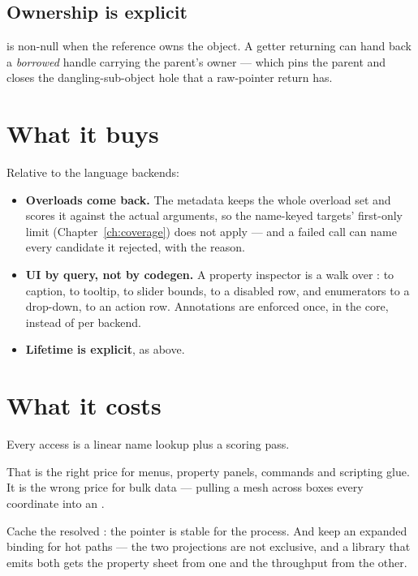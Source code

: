\subsection*{Ownership is explicit}

 is non-null when the reference owns the object. A getter
returning  can hand back a \emph{borrowed} handle carrying the
parent's owner --- which pins the parent and closes the dangling-sub-object hole
that a raw-pointer return has.

\section{What it buys}

Relative to the language backends:

\begin{itemize}
  \item \textbf{Overloads come back.} The metadata keeps the whole overload set
    and scores it against the actual arguments, so the name-keyed targets'
    first-only limit (Chapter~\ref{ch:coverage}) does not apply --- and a failed
    call can name every candidate it rejected, with the reason.
  \item \textbf{UI by query, not by codegen.} A property inspector is a walk
    over :  to caption,  to tooltip,
     to slider bounds,  to a disabled row,
     and enumerators to a drop-down,  to an action
    row. Annotations are enforced once, in the core, instead of per backend.
  \item \textbf{Lifetime is explicit}, as above.
\end{itemize}

\section{What it costs}

Every access is a linear name lookup plus a scoring pass.

That is the right price for menus, property panels, commands and scripting
glue. It is the wrong price for bulk data --- pulling a mesh across boxes every
coordinate into an .

\begin{note}
Cache the resolved : the pointer is stable for the process.
And keep an expanded binding for hot paths --- the two projections are not
exclusive, and a library that emits both gets the property sheet from one and
the throughput from the other.
\end{note}

